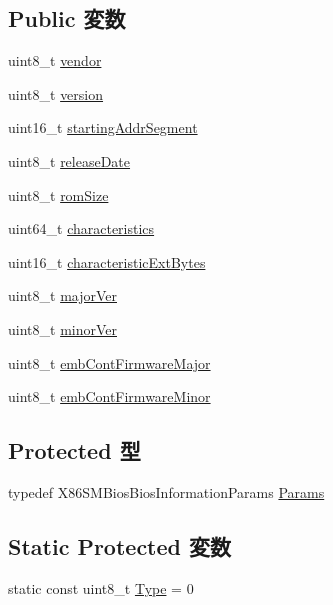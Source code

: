 \subsection*{Public 変数}
\begin{DoxyCompactItemize}
\item 
uint8\_\-t \hyperlink{classX86ISA_1_1SMBios_1_1BiosInformation_a80b9cd40703e1815a01bbd475056e442}{vendor}
\item 
uint8\_\-t \hyperlink{classX86ISA_1_1SMBios_1_1BiosInformation_ab22abc2906422da61885ac6c8e6a1a59}{version}
\item 
uint16\_\-t \hyperlink{classX86ISA_1_1SMBios_1_1BiosInformation_a21cc1beb883723f25c6750879babb414}{startingAddrSegment}
\item 
uint8\_\-t \hyperlink{classX86ISA_1_1SMBios_1_1BiosInformation_af87d15553ed50764db6420556a5ea58f}{releaseDate}
\item 
uint8\_\-t \hyperlink{classX86ISA_1_1SMBios_1_1BiosInformation_abc17b83f6b13b83428472dfa9221bfb5}{romSize}
\item 
uint64\_\-t \hyperlink{classX86ISA_1_1SMBios_1_1BiosInformation_a4690db8228d17825ab0639261607c5dd}{characteristics}
\item 
uint16\_\-t \hyperlink{classX86ISA_1_1SMBios_1_1BiosInformation_a2fb2a6607a2638a01101b0ed91c9ed08}{characteristicExtBytes}
\item 
uint8\_\-t \hyperlink{classX86ISA_1_1SMBios_1_1BiosInformation_aab5279e4ea9fa92ea7b8a00bd5424a02}{majorVer}
\item 
uint8\_\-t \hyperlink{classX86ISA_1_1SMBios_1_1BiosInformation_a20389866b5e9232941cb3222fd7c57c2}{minorVer}
\item 
uint8\_\-t \hyperlink{classX86ISA_1_1SMBios_1_1BiosInformation_a520db6fc2561b196500065e6872b170a}{embContFirmwareMajor}
\item 
uint8\_\-t \hyperlink{classX86ISA_1_1SMBios_1_1BiosInformation_ad89a5624f17c6d7262482d0bb9531695}{embContFirmwareMinor}
\end{DoxyCompactItemize}
\subsection*{Protected 型}
\begin{DoxyCompactItemize}
\item 
typedef X86SMBiosBiosInformationParams \hyperlink{classX86ISA_1_1SMBios_1_1BiosInformation_a80894fc0e6b20b3b6808ca61edf19aa1}{Params}
\end{DoxyCompactItemize}
\subsection*{Static Protected 変数}
\begin{DoxyCompactItemize}
\item 
static const uint8\_\-t \hyperlink{classX86ISA_1_1SMBios_1_1BiosInformation_a46e19e14cf69388be61379047f868891}{Type} = 0
\end{DoxyCompactItemize}


